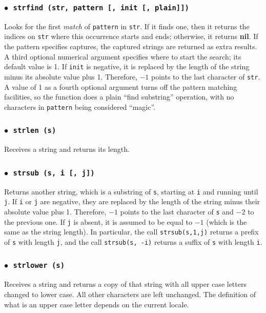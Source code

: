 \documentclass[11pt]{article}
\newcommand{\T}[1]{{\tt #1}}
\newcommand{\Math}[1]{$#1$}
\newcommand{\nil}{{\bf nil}}
\newcommand{\Deffunc}[1]{\index{#1}}
\newcommand{\ff}{$\bullet$\ }
\begin{document}
\subsubsection*{\ff \T{strfind (str, pattern [, init [, plain]])}}
\Deffunc{strfind}
Looks for the first \emph{match} of
\verb|pattern| in \verb|str|.
If it finds one, then it returns the indices on \verb|str|
where this occurrence starts and ends;
otherwise, it returns \nil.
If the pattern specifies captures,
the captured strings are returned as extra results.
A third optional numerical argument specifies where to start the search;
its default value is 1.
If \verb|init| is negative,
it is replaced by the length of the string minus its
absolute value plus 1.
Therefore, \Math{-1} points to the last character of \verb|str|.
A value of 1 as a fourth optional argument
turns off the pattern matching facilities,
so the function does a plain ``find substring'' operation,
with no characters in \verb|pattern| being considered ``magic''.

\subsubsection*{\ff \T{strlen (s)}}\Deffunc{strlen}
Receives a string and returns its length.

\subsubsection*{\ff \T{strsub (s, i [, j])}}\Deffunc{strsub}
Returns another string, which is a substring of \verb|s|,
starting at \verb|i|  and running until \verb|j|.
If \verb|i| or \verb|j| are negative,
they are replaced by the length of the string minus their
absolute value plus 1.
Therefore, \Math{-1} points to the last character of \verb|s|
and \Math{-2} to the previous one.
If \verb|j| is absent, it is assumed to be equal to \Math{-1}
(which is the same as the string length).
In particular,
the call \verb|strsub(s,1,j)| returns a prefix of \verb|s|
with length \verb|j|,
and the call \verb|strsub(s, -i)| returns a suffix of \verb|s|
with length \verb|i|.

\subsubsection*{\ff \T{strlower (s)}}\Deffunc{strlower}
Receives a string and returns a copy of that string with all
upper case letters changed to lower case.
All other characters are left unchanged.
The definition of what is an upper case
letter depends on the current locale.
\end{document}
